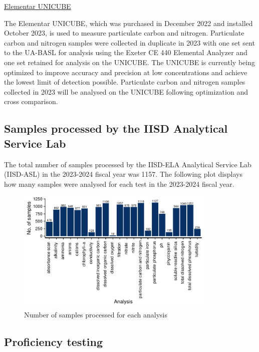 \documentclass[
]{article}
\begin{document}
\underline{Elementar UNICUBE}

The Elementar UNICUBE, which was purchased in December 2022 and
installed October 2023, is used to measure particulate carbon and
nitrogen. Particulate carbon and nitrogen samples were collected in
duplicate in 2023 with one set sent to the UA-BASL for analysis using
the Exeter CE 440 Elemental Analyzer and one set retained for analysis
on the UNICUBE. The UNICUBE is currently being optimized to improve
accuracy and precision at low concentrations and achieve the lowest
limit of detection possible. Particulate carbon and nitrogen samples
collected in 2023 will be analysed on the UNICUBE following optimization
and cross comparison.

\hypertarget{samples-processed-by-the-iisd-analytical-service-lab}{%
\subsection{Samples processed by the IISD Analytical Service
Lab}\label{samples-processed-by-the-iisd-analytical-service-lab}}

The total number of samples processed by the IISD-ELA Analytical Service
Lab (IISD-ASL) in the 2023-2024 fiscal year was 1157. The following plot
displays how many samples were analysed for each test in the 2023-2024
fiscal year.

\begin{figure}[h]
  \includegraphics[width=0.85\textwidth]{test_summary_plot.pdf}
  \caption{Number of samples processed for each analysis}
\end{figure}

\hypertarget{proficiency-testing}{%
\subsection{Proficiency testing}\label{proficiency-testing}}
\end{document}
